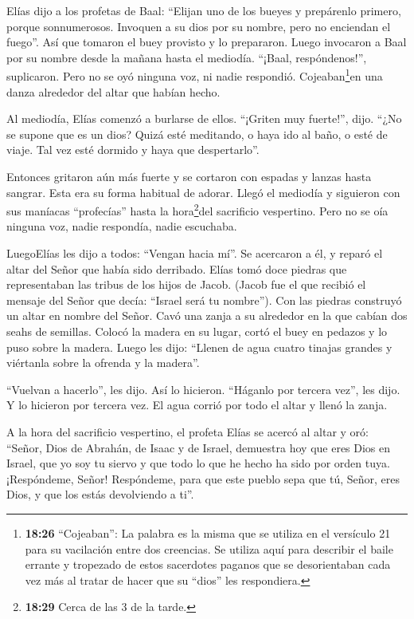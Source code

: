  Elías dijo a los profetas de Baal: ``Elijan uno de los
bueyes y prepárenlo primero, porque sonnumerosos. Invoquen a su dios por
su nombre, pero no enciendan el fuego''.  Así que tomaron
el buey provisto y lo prepararon. Luego invocaron a Baal por su nombre
desde la mañana hasta el mediodía. ``¡Baal, respóndenos!'', suplicaron.
Pero no se oyó ninguna voz, ni nadie respondió. Cojeaban\footnote{\textbf{18:26}
  ``Cojeaban'': La palabra es la misma que se utiliza en el versículo 21
  para su vacilación entre dos creencias. Se utiliza aquí para describir
  el baile errante y tropezado de estos sacerdotes paganos que se
  desorientaban cada vez más al tratar de hacer que su ``dios'' les
  respondiera.}en una danza alrededor del altar que habían hecho.

 Al mediodía, Elías comenzó a burlarse de ellos. ``¡Griten
muy fuerte!'', dijo. ``¿No se supone que es un dios? Quizá esté
meditando, o haya ido al baño, o esté de viaje. Tal vez esté dormido y
haya que despertarlo''.

 Entonces gritaron aún más fuerte y se cortaron con espadas
y lanzas hasta sangrar. Esta era su forma habitual de adorar.
 Llegó el mediodía y siguieron con sus maníacas
``profecías'' hasta la hora\footnote{\textbf{18:29} Cerca de las 3 de la
  tarde.}del sacrificio vespertino. Pero no se oía ninguna voz, nadie
respondía, nadie escuchaba.

 LuegoElías les dijo a todos: ``Vengan hacia mí''. Se
acercaron a él, y reparó el altar del Señor que había sido derribado.
 Elías tomó doce piedras que representaban las tribus de
los hijos de Jacob. (Jacob fue el que recibió el mensaje del Señor que
decía: ``Israel será tu nombre'').  Con las piedras
construyó un altar en nombre del Señor. Cavó una zanja a su alrededor en
la que cabían dos seahs de semillas.  Colocó la madera en
su lugar, cortó el buey en pedazos y lo puso sobre la madera. Luego les
dijo: ``Llenen de agua cuatro tinajas grandes y viértanla sobre la
ofrenda y la madera''.

 ``Vuelvan a hacerlo'', les dijo. Así lo hicieron.
``Háganlo por tercera vez'', les dijo. Y lo hicieron por tercera vez.
 El agua corrió por todo el altar y llenó la zanja.

 A la hora del sacrificio vespertino, el profeta Elías se
acercó al altar y oró: ``Señor, Dios de Abrahán, de Isaac y de Israel,
demuestra hoy que eres Dios en Israel, que yo soy tu siervo y que todo
lo que he hecho ha sido por orden tuya.  ¡Respóndeme,
Señor! Respóndeme, para que este pueblo sepa que tú, Señor, eres Dios, y
que los estás devolviendo a ti''.

